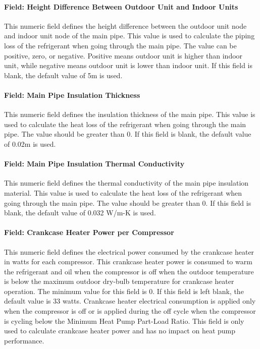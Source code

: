 \paragraph{Field: Height Difference Between Outdoor Unit and Indoor Units}\label{field-height-difference-between-outdoor-unit-and-indoor-units}

This numeric field defines the height difference between the outdoor unit node and indoor unit node of the main pipe. This value is used to calculate the piping loss of the refrigerant when going through the main pipe. The value can be positive, zero, or negative. Positive means outdoor unit is higher than indoor unit, while negative means outdoor unit is lower than indoor unit. If this field is blank, the default value of 5m is used.

\paragraph{Field: Main Pipe Insulation Thickness}\label{field-main-pipe-insulation-thickness}

This numeric field defines the insulation thickness of the main pipe. This value is used to calculate the heat loss of the refrigerant when going through the main pipe. The value should be greater than 0. If this field is blank, the default value of 0.02m is used.

\paragraph{Field: Main Pipe Insulation Thermal Conductivity}\label{field-main-pipe-insulation-thermal-conductivity}

This numeric field defines the thermal conductivity of the main pipe insulation material. This value is used to calculate the heat loss of the refrigerant when going through the main pipe. The value should be greater than 0. If this field is blank, the default value of 0.032 W/m-K is used.

\paragraph{Field: Crankcase Heater Power per Compressor}\label{field-crankcase-heater-power-per-compressor-1}

This numeric field defines the electrical power consumed by the crankcase heater in watts for each compressor. This crankcase heater power is consumed to warm the refrigerant and oil when the compressor is off when the outdoor temperature is below the maximum outdoor dry-bulb temperature for crankcase heater operation. The minimum value for this field is 0. If this field is left blank, the default value is 33 watts. Crankcase heater electrical consumption is applied only when the compressor is off or is applied during the off cycle when the compressor is cycling below the Minimum Heat Pump Part-Load Ratio. This field is only used to calculate crankcase heater power and has no impact on heat pump performance.

